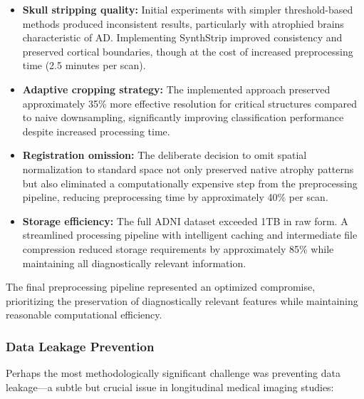 \documentclass[12pt, a4paper]{article}
\begin{document}
\begin{itemize}
    \item \textbf{Skull stripping quality:} Initial experiments with simpler threshold-based methods produced inconsistent results, particularly with atrophied brains characteristic of AD. Implementing SynthStrip improved consistency and preserved cortical boundaries, though at the cost of increased preprocessing time (2.5 minutes per scan).
    
    \item \textbf{Adaptive cropping strategy:} The implemented approach preserved approximately 35\% more effective resolution for critical structures compared to naive downsampling, significantly improving classification performance despite increased processing time.
    
    \item \textbf{Registration omission:} The deliberate decision to omit spatial normalization to standard space not only preserved native atrophy patterns but also eliminated a computationally expensive step from the preprocessing pipeline, reducing preprocessing time by approximately 40\% per scan.
    
    \item \textbf{Storage efficiency:} The full ADNI dataset exceeded 1TB in raw form. A streamlined processing pipeline with intelligent caching and intermediate file compression reduced storage requirements by approximately 85\% while maintaining all diagnostically relevant information.
\end{itemize}

The final preprocessing pipeline represented an optimized compromise, prioritizing the preservation of diagnostically relevant features while maintaining reasonable computational efficiency.

\subsubsection{Data Leakage Prevention}

Perhaps the most methodologically significant challenge was preventing data leakage—a subtle but crucial issue in longitudinal medical imaging studies:
\end{document}
